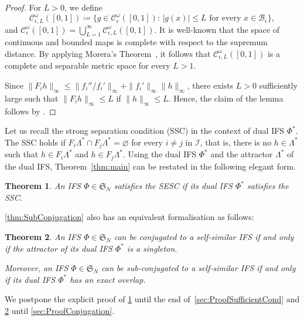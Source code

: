 \documentclass[11pt,]{article}
\def\cref#1{\ref{#1}}%
\newtheorem{theorem}{Theorem}[section]
\theoremstyle{definition}
\theoremstyle{remark}
\newcommand{\0}{\mathbf{0}}
\numberwithin{equation}{section}
\begin{document}
\begin{proof}
For $L>0$, we define 
$$
\mathcal{C}_{\epsilon,L}^{\omega}([0,1])\coloneqq \big\{g\in\mathcal{C}_\epsilon^{\omega}([0,1]):\,
|g(x)|\leq L\text{ for every }x\in\mathcal{B}_\epsilon\big\},
$$
and
$\mathcal{C}_{\epsilon}^{\omega}([0,1])=\bigcup_{L=1}^\infty\mathcal{C}_{\epsilon,L}^{\omega}([0,1])$.
It is well-known that the space of continuous and bounded maps is complete with respect to the
supremum distance. By applying Morera's Theorem~\cite[Theorem 10.17]{Rudin_AnalysisBook}, it follows
that $\mathcal{C}_{\epsilon,L}^{\omega}([0,1])$ is a complete and separable metric space for every
$L>1$.	
	
Since $\|F_ih\|_\infty\leq\|f_i'' / f_i'\|_\infty+\|f_i'\|_\infty\|h\|_\infty$, there exists $L>0$
sufficiently large such that $\|F_ih\|_\infty\leq L$ if $\|h\|_\infty\leq L$. Hence, the claim of
the lemma follows by \cite{Hutchinson_Attractor_81}.
\end{proof}
Let us recall the strong separation condition (SSC) in the context of dual IFS $\Phi^*$. The SSC
holds if $F_i\Lambda^*\cap F_j\Lambda^*=\varnothing$ for every $i\neq j$ in $\mathcal{I}$, that is,
there is no $h\in\Lambda^*$ such that $h\in F_i\Lambda^*$ and $h\in F_j\Lambda^*$.
Using the dual IFS $\Phi^*$ and the attractor $\Lambda^*$ of the dual IFS, Theorem~\ref{thm:main}
can be restated in the following elegant form.
\begin{theorem}\label{thm:DualSSC}
	An IFS $\Phi\in\mathfrak{S}_N$ satisfies the SESC if its dual IFS $\Phi^*$ satisfies the SSC.
\end{theorem}

\cref{thm:SubConjugation} also has an equivalent formalisation as follows:

\begin{theorem}\label{thm:DualConj}
	An IFS $\Phi\in\mathfrak{S}_N$ can be conjugated to a self-similar IFS if and only if the
	attractor of its dual IFS $\Phi^*$ is a singleton. 
	
	Moreover, an IFS $\Phi\in\mathfrak{S}_N$ can be sub-conjugated to a self-similar IFS if and
	only if its dual IFS $\Phi^*$ has an exact overlap.
\end{theorem}

We postpone the explicit proof of \cref{thm:DualSSC} until the end of~\cref{sec:ProofSufficientCond} and
\cref{thm:DualConj} until \cref{sec:ProofConjugation}.
\end{document}
